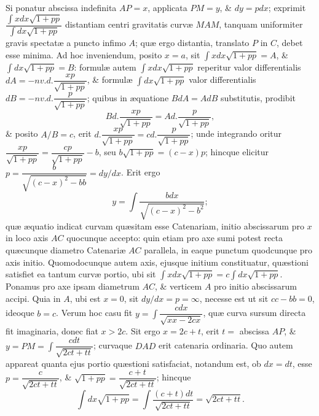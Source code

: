 Si ponatur abscissa indefinita $AP=x$, applicata $PM=y$, \& $dy=pdx$; exprimit $\dfrac{\int xdx\sqrt{1+pp}}{\int dx\sqrt{1+pp}}$ distantiam centri gravitatis curvæ $MAM$, tanquam uniformiter gravis spectatæ a puncto infimo $A$; quæ ergo distantia, translato $P$ in $C$, debet esse minima. Ad hoc inveniendum, posito $x=a$, sit $\int xdx\sqrt{1+pp}=A$, \& $\int dx\sqrt{1+pp}=B$: formulæ autem $\int xdx\sqrt{1+pp}$ reperitur valor differentialis $dA=-nv.d.\dfrac{xp}{\sqrt{1+pp}}$, \& formulæ $\int dx\sqrt{1+pp}$ valor differentialis $dB=-nv.d.\dfrac{p}{\sqrt{1+pp}}$; quibus in æquatione $BdA=AdB$ substitutis, prodibit
\[Bd.\frac{xp}{\sqrt{1+pp}}=Ad.\frac{p}{\sqrt{1+pp}},\]
\& posito $A/B=c$, erit $d.\dfrac{xp}{\sqrt{1+pp}}=cd.\dfrac{p}{\sqrt{1+pp}}$; unde integrando oritur $\dfrac{xp}{\sqrt{1+pp}}=\dfrac{cp}{\sqrt{1+pp}}-b$, seu $b\sqrt{1+pp}=(c-x)p$; hincque elicitur $p=\dfrac{b}{\sqrt{(c-x)^2-bb}}=dy/dx$. Erit ergo
\[y=\int\frac{bdx}{\sqrt{(c-x)^2-b^2}};\]
quæ æquatio indicat curvam quæsitam esse Catenariam, initio abscissarum pro $x$ in loco axis $AC$ quocunque accepto: quin etiam pro axe sumi potest recta quæcunque diametro Catenariæ $AC$ parallela, in eaque punctum quodcunque pro axis initio. Quomodocunque autem axis, ejusque initium constituatur, quæstioni satisfiet ea tantum curvæ portio, ubi sit $\int xdx\sqrt{1+pp}=c\int dx\sqrt{1+pp}$. Ponamus pro axe ipsam diametrum $AC$, \& verticem $A$ pro initio abscissarum accipi. Quia in $A$, ubi est $x=0$, sit $dy/dx=p=\infty$, necesse est ut sit $cc-bb=0$, ideoque $b=c$. Verum hoc casu fit $y=\int\dfrac{cdx}{\sqrt{xx-2cx}}$, quæ curva sursum directa fit imaginaria, donec fiat $x>2c$. Sit ergo $x=2c+t$, erit $t=$ abscissa $AP$, \& $y=PM=\int\dfrac{cdt}{\sqrt{2ct+tt}}$; curvaque $DAD$ erit catenaria ordinaria. Quo autem appareat quanta ejus portio quæstioni satisfaciat, notandum est, ob $dx=dt$, esse $p=\dfrac{c}{\sqrt{2ct+tt}}$, \& $\sqrt{1+pp}=\dfrac{c+t}{\sqrt{2ct+tt}}$; hincque
\[\int dx\sqrt{1+pp}=\int\frac{(c+t)dt}{\sqrt{2ct+tt}}=\sqrt{2ct+tt}.\]
